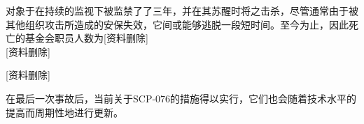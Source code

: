 对象于在持续的监视下被监禁了了三年，并在其苏醒时将之击杀，尽管通常由于被其他组织攻击所造成的安保失效，它间或能够逃脱一段短时间。至今为止，因此死亡的基金会职员人数为{[}资料删除]\\
{[}资料删除]

{[}资料删除]

在最后一次事故后，当前关于SCP-076的措施得以实行，它们也会随着技术水平的提高而周期性地进行更新。




